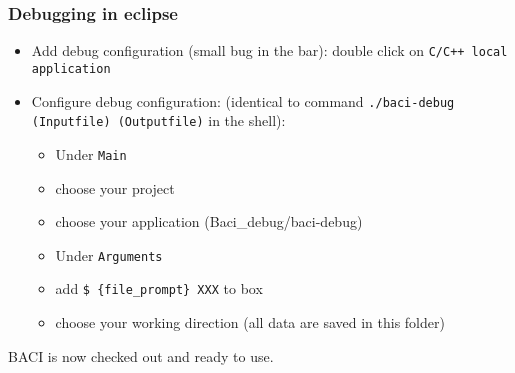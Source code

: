 \subsubsection{Debugging in eclipse}

\begin{itemize}

\item Add debug configuration (small bug in the bar): double click on \texttt{C/C++ local application}

\item Configure debug configuration: (identical to command \texttt{./baci-debug (Inputfile) (Outputfile)} in the shell):

\begin{itemize}
\item Under \texttt{Main}
\item choose your project
\item choose your application (Baci\_debug/baci-debug)
\item Under \texttt{Arguments}
\item add \texttt{\$ \{file\_prompt\} XXX} to box
\item choose your working direction (all data are saved in this folder)
\end{itemize}

\end{itemize}

BACI is now checked out and ready to use.

